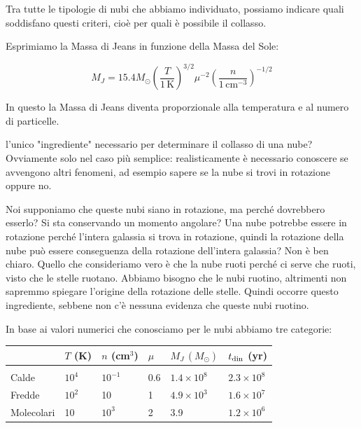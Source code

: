 Tra tutte le tipologie di nubi che abbiamo individuato, possiamo indicare quali soddisfano questi criteri, cioè per quali è possibile il collasso.

Esprimiamo la Massa di Jeans in funzione della Massa del Sole:

$$M_{J}=15.4 M_{\odot} \left( \frac{T}{1 \, \text{K}} \right)^{3/2} \mu^{-2} \left( \frac{n}{1 \, \text{cm}^{-3}} \right)^{-1/2}$$

In questo la Massa di Jeans diventa proporzionale alla temperatura e al numero di particelle.

\E l'unico "ingrediente" necessario per determinare il collasso di una nube? Ovviamente solo nel caso più semplice: realisticamente è necessario conoscere se avvengono altri fenomeni, ad esempio sapere se la nube si trovi in rotazione oppure no.


Noi supponiamo che queste nubi siano in rotazione, ma perché dovrebbero esserlo? Si sta conservando un momento angolare? Una nube potrebbe essere in rotazione perché l'intera galassia si trova in rotazione, quindi la rotazione della nube può essere conseguenza della rotazione dell'intera galassia? Non è ben chiaro. Quello che consideriamo vero è che la nube ruoti perché ci serve che ruoti, visto che le stelle ruotano. Abbiamo bisogno che le nubi ruotino, altrimenti non sapremmo spiegare l'origine della rotazione delle stelle. Quindi occorre questo ingrediente, sebbene non c'è nessuna evidenza che queste nubi ruotino.

In base ai valori numerici che conosciamo per le nubi abbiamo tre categorie:

\begin{center}
    \begin{tabular}{llllll}
        & $T$ (K) & $n$ (cm$^3$) & $\mu$ & $M_J \, (M_{\odot})$ & $t_{\rm din}$ (yr)\\
        \hline
        \\[-0.4cm]
        Calde & $10^4$ & $10^{-1}$ & 0.6 & $1.4 \times 10^8$ & $2.3 \times 10^8$\\
        Fredde & $10^2$ & 10 & 1 & $4.9 \times 10^3$ & $1.6 \times 10^7$\\
        Molecolari & 10 & $10^{3}$ & 2 & 3.9 & $1.2 \times 10^6$\\
    \end{tabular}
\end{center}

